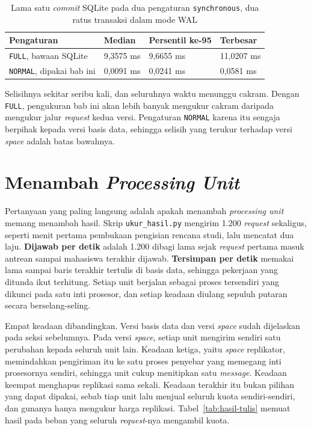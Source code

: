 \begin{table}[htbp]
  \centering
  \caption{Lama satu \textit{commit} SQLite pada dua pengaturan
    \texttt{synchronous}, dua ratus transaksi dalam mode WAL}
  \label{tab:harga-commit}
  \begin{tabularx}{\textwidth}{|X|l|l|l|}
    \hline
    \textbf{Pengaturan} & \textbf{Median} & \textbf{Persentil ke-95} & \textbf{Terbesar} \\
    \hline
    \texttt{FULL}, bawaan SQLite & 9,3575 ms & 9,6655 ms & 11,0207 ms \\
    \hline
    \texttt{NORMAL}, dipakai bab ini & 0,0091 ms & 0,0241 ms & 0,0581 ms \\
    \hline
  \end{tabularx}
\end{table}

Selisihnya sekitar seribu kali, dan seluruhnya waktu menunggu cakram. Dengan
\texttt{FULL}, pengukuran bab ini akan lebih banyak mengukur cakram daripada
mengukur jalur \textit{request} kedua versi. Pengaturan \texttt{NORMAL} karena
itu sengaja berpihak kepada versi basis data, sehingga selisih yang terukur
terhadap versi \textit{space} adalah batas bawahnya.

\section{Menambah \textit{Processing Unit}}

Pertanyaan yang paling langsung adalah apakah menambah \textit{processing unit}
memang menambah hasil. Skrip \texttt{ukur\_hasil.py} mengirim 1.200
\textit{request} sekaligus, seperti menit pertama pembukaan pengisian rencana
studi, lalu mencatat dua laju. \textbf{Dijawab per detik} adalah 1.200 dibagi
lama sejak \textit{request} pertama masuk antrean sampai mahasiswa terakhir
dijawab. \textbf{Tersimpan per detik} memakai lama sampai baris terakhir tertulis
di basis data, sehingga pekerjaan yang ditunda ikut terhitung. Setiap unit
berjalan sebagai proses tersendiri yang dikunci pada satu inti prosesor, dan
setiap keadaan diulang sepuluh putaran secara berselang-seling.

Empat keadaan dibandingkan. Versi basis data dan versi \textit{space} sudah
dijelaskan pada seksi sebelumnya. Pada versi \textit{space}, setiap unit
mengirim sendiri satu perubahan kepada seluruh unit lain. Keadaan ketiga, yaitu
\textit{space} replikator, memindahkan pengiriman itu ke satu proses penyebar
yang memegang inti prosesornya sendiri, sehingga unit cukup menitipkan satu
\textit{message}. Keadaan keempat menghapus replikasi sama sekali. Keadaan terakhir itu
bukan pilihan yang dapat dipakai, sebab tiap unit lalu menjual seluruh kuota
sendiri-sendiri, dan gunanya hanya mengukur harga replikasi.
Tabel~\ref{tab:hasil-tulis} memuat hasil pada beban yang seluruh
\textit{request}-nya mengambil kuota.

